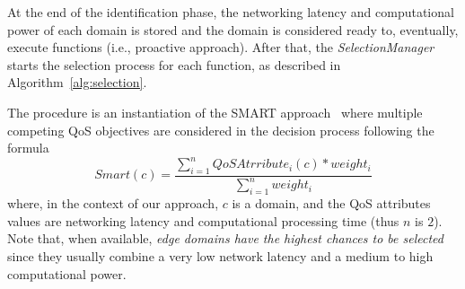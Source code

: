 At the end of the identification phase, the networking latency and computational power of each domain is stored and the domain is considered ready to, eventually, execute functions (i.e., proactive approach). After that, the \textit{SelectionManager} starts the selection process for each function, as described in Algorithm~\ref{alg:selection}. 


The procedure is an instantiation of the SMART approach~\cite{Olson1996} where multiple competing QoS objectives are considered in the decision process following the formula
\begin{equation}
Smart(c) = \frac{\sum_{i=1}^{n} QoSAtrribute_i(c)*weight_i}{\sum_{i=1}^{n}weight_i} \label{eq:smart}
\end{equation}
where, in the context of our approach, $c$ is a domain, and the QoS attributes values are networking latency and computational processing time (thus $n$ is $2$).
Note that, when available, \textit{edge domains have the highest chances to be selected} since they usually combine a very low network latency and a medium to high computational power. 

